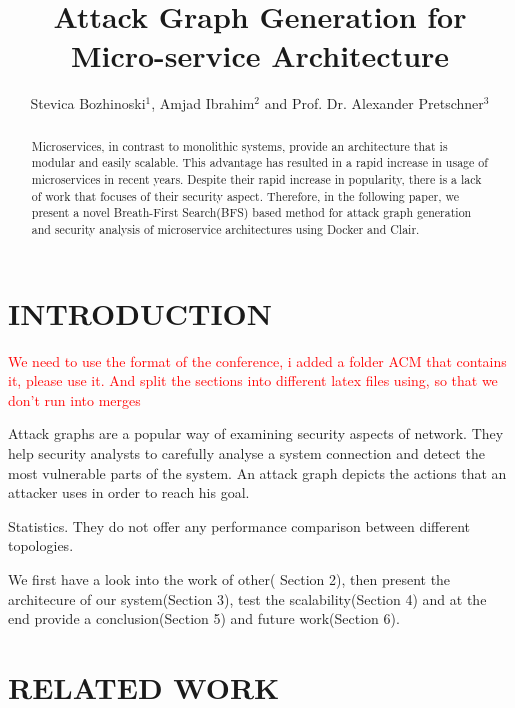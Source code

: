 \documentclass[letterpaper, 10 pt, conference]{ieeeconf}  %
\title{\LARGE \bf
Attack Graph Generation for Micro-service
Architecture
}
\author{Stevica Bozhinoski$^{1}$, Amjad Ibrahim$^{2}$ and Prof. Dr. Alexander Pretschner$^{3}$%
}
\newcommand\todo[1]{\textcolor{red}{#1}}                                     %
\begin{document}
\maketitle
\thispagestyle{empty}
\pagestyle{empty}



\begin{abstract}
Microservices, in contrast to monolithic systems, provide an architecture that is modular and easily scalable. This advantage has resulted in a rapid increase in usage of microservices in recent years. Despite their rapid increase in popularity, there is a lack of work that focuses of their security aspect. Therefore, in the following paper, we present a novel Breath-First Search(BFS) based method for attack graph generation and security analysis of microservice architectures using Docker and Clair. 

\end{abstract}


\section{INTRODUCTION}

\todo{We need to use the format of the conference, i added a folder ACM that contains it, please use it. And split the sections into different latex files using, so that we don't run into merges }

Attack graphs are a popular way of examining security aspects of network. They help security analysts to carefully analyse a system connection and detect the most vulnerable parts of the system. An attack graph depicts the actions that an attacker uses in order to reach his goal.  

 Statistics. They do not offer any performance comparison between different topologies. 

We first have a look into the work of other( Section 2), then present the architecure of our system(Section 3), test the scalability(Section 4) and at the end provide a conclusion(Section 5) and future work(Section 6).

\section{RELATED WORK}
\end{document}
